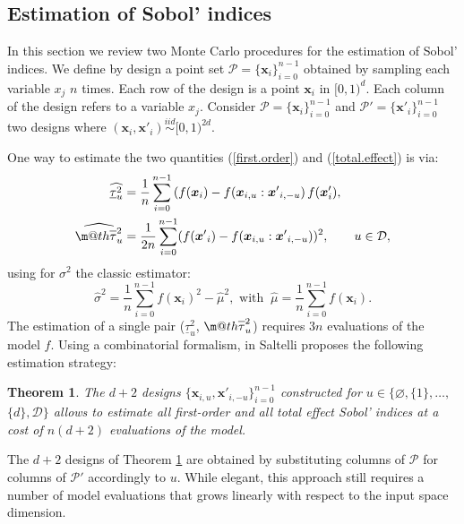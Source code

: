 \documentclass[]{elsarticle}
\makeatletter
\newtheorem{theorem}{Theorem}
\theoremstyle{definition}
\newcommand{\bvec}[1]{\boldsymbol{#1}}
\newcommand{\vx}{\bvec{x}}
\newcommand\iid{\stackrel{iid}{\sim}}
\newcommand*{\ov}[1]{
  \m@th\overline{\mbox{#1}\raisebox{2mm}{}}
}
\makeatother
\begin{document}
\subsection{Estimation of Sobol' indices}
\label{estimation.strategies}
In this section we review two Monte Carlo procedures for the estimation of Sobol' indices. We define by design a point set $\mathcal{P}=\{\vx_i\}_{i=0}^{n-1}$ obtained by sampling each variable $x_j$ $n$ times. Each row of the design is a point $\vx_i$ in $[0,1)^d$. Each column of the design refers to a variable $x_j$. Consider $\mathcal{P}=\{\vx_i\}_{i=0}^{n-1}$ and $\mathcal{P'}=\{{\vx'}_i\}_{i=0}^{n-1}$ two designs where $(\vx_i,{\vx'}_i) \iid [0,1)^{2d}$. 
\bigskip

One way to estimate the two quantities (\ref{first.order}) and (\ref{total.effect}) is via:
\begin{align}
\label{first.order.est}
\widehat{\underline{\tau}_u^2} & = \frac{1}{n} \sum \limits_{i=0}^{n-1} \left(f(\vx_i)-f(\vx_{i,u}:{\vx'}_{i,-u}\right)f(\vx'_i),\\
\label{total.effect.est}
\widehat{\ov{$\tau$}_u^2} & = \frac{1}{2n} \sum \limits_{i=0}^{n-1} (f({\vx'}_i) - f(\vx_{i,u}:{\vx'}_{i,-u}))^2, \qquad u \in \mathcal{D},
\end{align}
using for $\sigma^2$ the classic estimator:
\begin{equation}
 \widehat{\sigma}^2 = \frac{1}{n} \sum \limits_{i=0}^{n-1} f(\vx_i)^2 - \widehat{\mu}^2, \text{ with } \ \widehat{\mu} =  \frac{1}{n} \sum \limits_{i=0}^{n-1} f(\vx_i).
\label{mu.est}
\end{equation}
The estimation of a single pair ($\underline{\tau}_u^2$, $\ov{$\tau$}_u^2$) requires $3n$ evaluations of the model $f$. Using a combinatorial formalism, in \cite[Theorem 1]{Saltelli} Saltelli proposes the following estimation strategy:
\begin{theorem}
\label{saltelli.theorem}
The $d+2$ designs $\{\vx_{i,u},{\vx'}_{i,-u}\}_{i=0}^{n-1}$ constructed for $u \in \{\varnothing,\{1\},\dots,$ $\{d\},\mathcal{D}\}$ allows to estimate all first-order and all total effect Sobol' indices at a cost of $n(d+2)$ evaluations of the model.
\end{theorem}
The $d+2$ designs of Theorem \ref{saltelli.theorem} are obtained by substituting columns of $\mathcal{P}$ for columns of $\mathcal{P}'$ accordingly to $u$. While elegant, this approach still requires a number of model evaluations that grows linearly with respect to the input space dimension.
\end{document}

